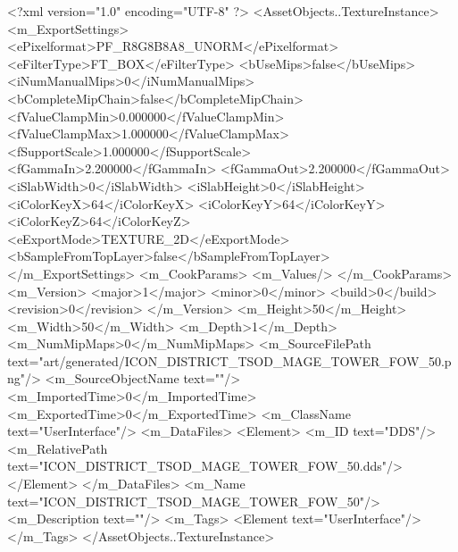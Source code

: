 <?xml version="1.0" encoding="UTF-8" ?>
<AssetObjects..TextureInstance>
	<m_ExportSettings>
		<ePixelformat>PF_R8G8B8A8_UNORM</ePixelformat>
		<eFilterType>FT_BOX</eFilterType>
		<bUseMips>false</bUseMips>
		<iNumManualMips>0</iNumManualMips>
		<bCompleteMipChain>false</bCompleteMipChain>
		<fValueClampMin>0.000000</fValueClampMin>
		<fValueClampMax>1.000000</fValueClampMax>
		<fSupportScale>1.000000</fSupportScale>
		<fGammaIn>2.200000</fGammaIn>
		<fGammaOut>2.200000</fGammaOut>
		<iSlabWidth>0</iSlabWidth>
		<iSlabHeight>0</iSlabHeight>
		<iColorKeyX>64</iColorKeyX>
		<iColorKeyY>64</iColorKeyY>
		<iColorKeyZ>64</iColorKeyZ>
		<eExportMode>TEXTURE_2D</eExportMode>
		<bSampleFromTopLayer>false</bSampleFromTopLayer>
	</m_ExportSettings>
	<m_CookParams>
		<m_Values/>
	</m_CookParams>
	<m_Version>
		<major>1</major>
		<minor>0</minor>
		<build>0</build>
		<revision>0</revision>
	</m_Version>
	<m_Height>50</m_Height>
	<m_Width>50</m_Width>
	<m_Depth>1</m_Depth>
	<m_NumMipMaps>0</m_NumMipMaps>
	<m_SourceFilePath text="art/generated/ICON_DISTRICT_TSOD_MAGE_TOWER_FOW_50.png"/>
	<m_SourceObjectName text=""/>
	<m_ImportedTime>0</m_ImportedTime>
	<m_ExportedTime>0</m_ExportedTime>
	<m_ClassName text="UserInterface"/>
	<m_DataFiles>
		<Element>
			<m_ID text="DDS"/>
			<m_RelativePath text="ICON_DISTRICT_TSOD_MAGE_TOWER_FOW_50.dds"/>
		</Element>
	</m_DataFiles>
	<m_Name text="ICON_DISTRICT_TSOD_MAGE_TOWER_FOW_50"/>
	<m_Description text=""/>
	<m_Tags>
		<Element text="UserInterface"/>
	</m_Tags>
</AssetObjects..TextureInstance>
